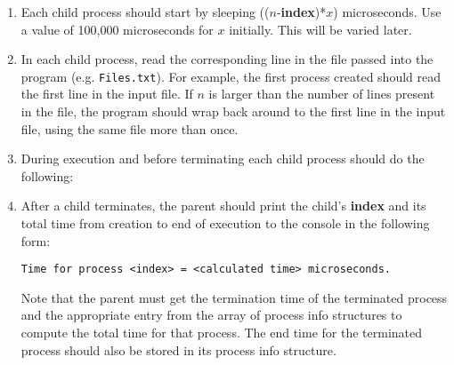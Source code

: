 \documentclass[12pt]{article}
\begin{document}
\begin{enumerate}
\begin{enumerate}
    \item Each child process should start by sleeping
    (($n$-\textbf{index})*$x$) microseconds.  Use a value of 100,000
    microseconds for $x$ initially. This will be varied later.
					
    \item In each child process, read the corresponding line in the
    file passed into the program (e.g. \texttt{Files.txt}).  For
    example, the first process created should read the first line in
    the input file.  If $n$ is larger than the number of lines present
    in the file, the program should wrap back around to the first line
    in the input file, using the same file more than once.

    \item During execution and before terminating each child process
    should do the following:

    \item After a child terminates, the parent should print the
    child's \textbf{index} and its total time from creation to end of
    execution to the console in the following form:
\begin{verbatim}
Time for process <index> = <calculated time> microseconds.
\end{verbatim}

    Note that the parent must get the termination time of the
    terminated process and the appropriate entry from the array of
    process info structures to compute the total time for that
    process.  The end time for the terminated process should also be
    stored in its process info structure.
					

\end{enumerate}
\end{enumerate}
\end{document}
